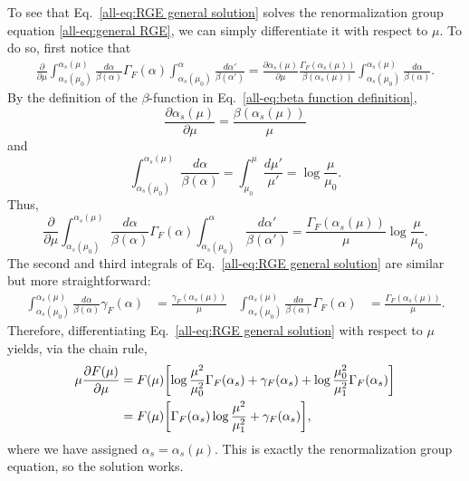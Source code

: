 \documentclass[../thesis.tex]{subfiles}
\begin{document}
	To see that Eq.~\ref{all-eq:RGE general solution} solves the renormalization group equation \ref{all-eq:general RGE}, we can simply differentiate it with respect to $\mu$. To do so, first notice that
	\begin{equation}
	\begin{aligned}
		\frac{\partial}{\partial \mu} \int_{\alpha_s(\mu_0)}^{\alpha_s(\mu)} \frac{d\alpha}{\beta(\alpha)}\Gamma_F(\alpha) \int_{\alpha_s(\mu_0)}^\alpha \frac{d\alpha'}{\beta(\alpha')} = \frac{\partial \alpha_s(\mu)}{\partial \mu} \frac{\Gamma_F(\alpha_s(\mu))}{\beta(\alpha_s(\mu))} \int_{\alpha_s(\mu_0)}^{\alpha_s(\mu)} \frac{d\alpha}{\beta(\alpha)}.
	\end{aligned}
	\end{equation}
	By the definition of the $\beta$-function in Eq.~\ref{all-eq:beta function definition},
	\begin{equation}
		\frac{\partial \alpha_s(\mu)}{\partial \mu} = \frac{\beta(\alpha_s(\mu))}{\mu}
	\end{equation}
	and
	\begin{equation}
		\int_{\alpha_s(\mu_0)}^{\alpha_s(\mu)} \frac{d\alpha}{\beta(\alpha)} = \int_{\mu_0}^\mu \frac{d\mu'}{\mu'} = \log\frac{\mu}{\mu_0}.
	\end{equation}
	Thus,
	\begin{equation}
		\frac{\partial}{\partial \mu} \int_{\alpha_s(\mu_0)}^{\alpha_s(\mu)} \frac{d\alpha}{\beta(\alpha)}\Gamma_F(\alpha) \int_{\alpha_s(\mu_0)}^\alpha \frac{d\alpha'}{\beta(\alpha')} = \frac{\Gamma_F(\alpha_s(\mu))}{\mu} \log \frac{\mu}{\mu_0}.
	\end{equation}
	The second and third integrals of Eq.~\ref{all-eq:RGE general solution} are similar but more straightforward:
	\begin{align}
		\int_{\alpha_s(\mu_0)}^{\alpha_s(\mu)} \frac{d\alpha}{\beta(\alpha)}\gamma_F(\alpha) &= \frac{\gamma_F(\alpha_s(\mu))}{\mu} & \int_{\alpha_s(\mu_0)}^{\alpha_s(\mu)} \frac{d\alpha}{\beta(\alpha)}\Gamma_F(\alpha) &= \frac{\Gamma_F(\alpha_s(\mu))}{\mu}.
	\end{align}
	Therefore, differentiating Eq.~\ref{all-eq:RGE general solution} with respect to $\mu$ yields, via the chain rule,
	\begin{equation}
	\begin{aligned}
		\mu \frac{\partial F(\mu)}{\partial \mu} &= F(\mu) \qty[\log\frac{\mu^2}{\mu_0^2} \Gamma_F(\alpha_s) + \gamma_F(\alpha_s) + \log\frac{\mu_0^2}{\mu_1^2}\Gamma_F(\alpha_s)] \\
		&= F(\mu) \qty[\Gamma_F(\alpha_s)\log\frac{\mu^2}{\mu_1^2} + \gamma_F(\alpha_s)],
	\end{aligned}
	\end{equation}
	where we have assigned $\alpha_s = \alpha_s(\mu)$. This is exactly the renormalization group equation, so the solution works.
\end{document}
